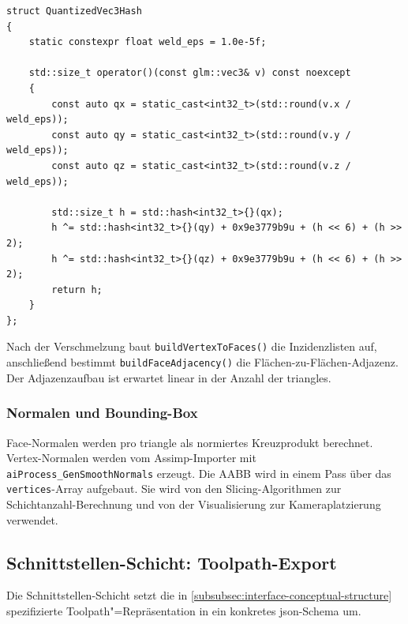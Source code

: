                 \begin{lstlisting}[style=cppStyle, caption={Quantisierter Hash für Vertex-Welding.}, label={lst:impl-medusa-vertex-hash}]
struct QuantizedVec3Hash
{
    static constexpr float weld_eps = 1.0e-5f;

    std::size_t operator()(const glm::vec3& v) const noexcept
    {
        const auto qx = static_cast<int32_t>(std::round(v.x / weld_eps));
        const auto qy = static_cast<int32_t>(std::round(v.y / weld_eps));
        const auto qz = static_cast<int32_t>(std::round(v.z / weld_eps));

        std::size_t h = std::hash<int32_t>{}(qx);
        h ^= std::hash<int32_t>{}(qy) + 0x9e3779b9u + (h << 6) + (h >> 2);
        h ^= std::hash<int32_t>{}(qz) + 0x9e3779b9u + (h << 6) + (h >> 2);
        return h;
    }
};
                \end{lstlisting}

                Nach der Verschmelzung baut \texttt{buildVertexToFaces()} die Inzidenzlisten auf, anschließend bestimmt \texttt{buildFaceAdjacency()} die Flächen-zu-Flächen-Adjazenz.
                Der Adjazenzaufbau ist erwartet linear in der Anzahl der \glspl{triangle}.

            \subsubsection{Normalen und Bounding-Box}\label{subsubsec:impl-medusa-normals-aabb}
                Face-Normalen werden pro \gls{triangle} als normiertes Kreuzprodukt berechnet.
                Vertex-Normalen werden vom Assimp-Importer mit \texttt{aiProcess\_GenSmoothNormals} erzeugt.
                Die \ac{AABB} wird in einem Pass über das \texttt{vertices}-Array aufgebaut.
                Sie wird von den Slicing-Algorithmen zur Schichtanzahl-Berechnung und von der Visualisierung zur Kameraplatzierung verwendet.

        \subsection{Schnittstellen-Schicht: Toolpath-Export}\label{subsec:impl-medusa-exporter} 
            Die Schnittstellen-Schicht setzt die in \cref{subsubsec:interface-conceptual-structure} spezifizierte Toolpath"=Repräsentation in ein konkretes \gls{json}-Schema um.

